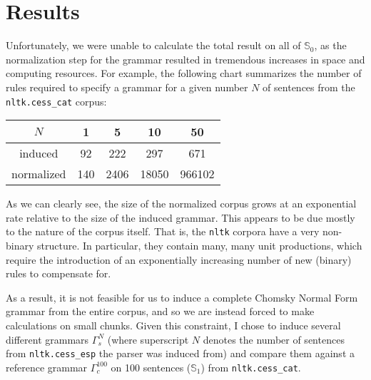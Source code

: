 \documentclass[paper=a4, fontsize=11pt]{scrartcl} %
\newcommand{\gcat}{\Gamma_{c}}
\newcommand{\gesp}{\Gamma_{s}}
\begin{document}
\section*{Results}

Unfortunately, we were unable to calculate the total result on all of $\mathbb{S}_0$, as the normalization step for the grammar resulted in tremendous increases in space and computing resources.  For example, the following chart summarizes the number of rules required to specify a grammar for a given number $N$ of sentences from the \texttt{nltk.cess\_cat} corpus:
\begin{center}
    \begin{tabular}{|c|cccc|}
        \hline
        $N$ & 1 & 5 & 10 & 50 \\
        \hline
        induced & 92 & 222 & 297 & 671 \\
        normalized & 140 & 2406 & 18050 & 966102 \\
        \hline
    \end{tabular}
\end{center}
As we can clearly see, the size of the normalized corpus grows at an exponential rate relative to the size of the induced grammar.  This appears to be due mostly to the nature of the corpus itself.  That is, the \texttt{nltk} corpora have a very non-binary structure.  In particular, they contain many, many unit productions, which require the introduction of an exponentially increasing number of new (binary) rules to compensate for.

As a result, it is not feasible for us to induce a complete Chomsky Normal Form grammar from the entire corpus, and so we are instead forced to make calculations on small chunks.  Given this constraint, I chose to induce several different grammars $\gesp^N$ (where superscript $N$ denotes the number of sentences from \texttt{nltk.cess\_esp} the parser was induced from) and compare them against a reference grammar $\gcat^{100}$ on 100 sentences ($\mathbb{S}_1$) from \texttt{nltk.cess\_cat}.
\end{document}

